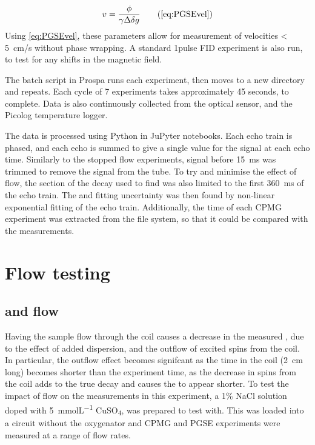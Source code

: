 \begin{equation*}
v = \frac{\phi}{\gamma \Delta \delta g} \tag{\ref{eq:PGSEvel}}
\end{equation*}
Using \autoref{eq:PGSEvel}, these parameters allow for measurement of velocities \SI{< 5}{cm/s} without phase wrapping.
A standard 1pulse FID experiment is also run, to test for any shifts in the magnetic field.

The batch script in Prospa runs each experiment, then moves to a new directory and repeats.
Each cycle of 7 experiments takes approximately 45 seconds, to complete.
Data is also continuously collected from the optical \SOtwo sensor, and the Picolog temperature logger.

The data is processed using Python in JuPyter notebooks.
Each echo train is phased, and each echo is summed to give a single value for the signal at each echo time.
Similarly to the stopped flow experiments, signal before \SI{15}{ms} was trimmed to remove the signal from the tube.
To try and minimise the effect of flow, the section of the decay used to find \Ttwo was also limited to the first \SI{360}{ms} of the echo train.
The \Ttwo and fitting uncertainty was then found by non-linear exponential fitting of the echo train.
Additionally, the time of each CPMG experiment was extracted from the file system, so that it could be compared with the \SOtwo measurements.


\section{Flow testing}
\subsection{\Ttwo and flow}
\label{sec:contflow-Ttwoflow}
Having the sample flow through the coil causes a decrease in the measured \Ttwo, due to the effect of added dispersion, and the outflow of excited spins from the coil.
In particular, the outflow effect becomes signifcant as the time in the coil (\SI{2}{cm} long) becomes shorter than the experiment time, as the decrease in spins from the coil adds to the true \Ttwo decay and causes the \Ttwo to appear shorter.
To test the impact of flow on the \Ttwo measurements in this experiment, a 1\% NaCl solution doped with \SI{5}{mmolL^{-1}} CuSO\textsubscript{4}, was prepared to test with.
This was loaded into a circuit without the oxygenator and CPMG and PGSE experiments were measured at a range of flow rates.

